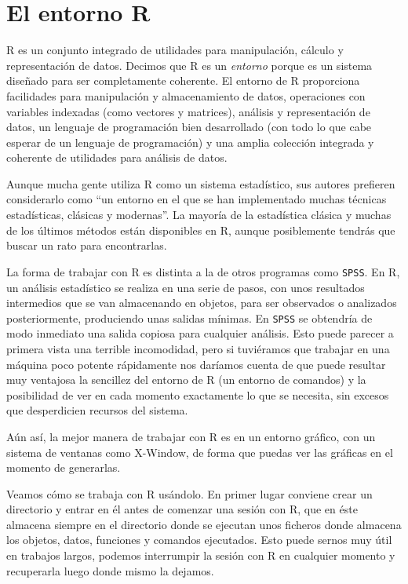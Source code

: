 
\section{El entorno R}


{\sf  R} es  un conjunto  integrado de  utilidades para  manipulación,
cálculo  y  representación  de  datos.  Decimos  que  {\sf  R}  es  un
{\em entorno}  porque es  un sistema  diseñado para  ser completamente
coherente.  El  entorno  de   {\sf  R}  proporciona  facilidades  para
manipulación  y almacenamiento  de  datos,  operaciones con  variables
indexadas  (como vectores  y matrices),  análisis y  representación de
datos, un lenguaje de programación  bien desarrollado (con todo lo que
cabe esperar  de un lenguaje  de programación) y una  amplia colección
integrada y coherente de utilidades para análisis de datos.

Aunque mucha  gente utiliza {\sf  R} como un sistema  estadístico, sus
autores  prefieren considerarlo  como ``un  entorno en  el que  se han
implementado muchas  técnicas estadísticas, clásicas y  modernas''. La
mayoría  de la  estadística clásica  y muchas  de los  últimos métodos
están disponibles en  {\sf R}, aunque posiblemente  tendrás que buscar
un rato para encontrarlas.

La forma de trabajar  con {\sf R} es distinta a  la de otros programas
como {\tt SPSS}. En {\sf R}, un análisis estadístico se realiza en una
serie de pasos, con unos resultados intermedios que se van almacenando
en  objetos,   para  ser   observados  o   analizados  posteriormente,
produciendo unas salidas  mínimas. En {\tt SPSS} se  obtendría de modo
inmediato  una  salida copiosa  para  cualquier  análisis. Esto  puede
parecer a primera  vista una terrible incomodidad,  pero si tuviéramos
que  trabajar en  una máquina  poco potente  rápidamente nos  daríamos
cuenta de que puede resultar muy ventajosa la sencillez del entorno de
{\sf  R} (un  entorno de  comandos) y  la posibilidad  de ver  en cada
momento exactamente lo  que se necesita, sin  excesos que desperdicien
recursos del sistema.

Aún así, la mejor  manera de trabajar con R es  en un entorno gráfico,
con un sistema de ventanas como  X-Window, de forma que puedas ver las
gráficas en el momento de generarlas.

Veamos cómo se trabaja con {\sf  R} usándolo. En primer lugar conviene
crear un  directorio y entrar en  él antes de comenzar  una sesión con
{\sf  R}, que  en  éste almacena  siempre en  el  directorio donde  se
ejecutan unos ficheros donde almacena  los objetos, datos, funciones y
comandos ejecutados.  Esto puede sernos  muy útil en  trabajos largos,
podemos  interrumpir la  sesión con  {\sf  R} en  cualquier momento  y
recuperarla luego donde mismo la dejamos.

